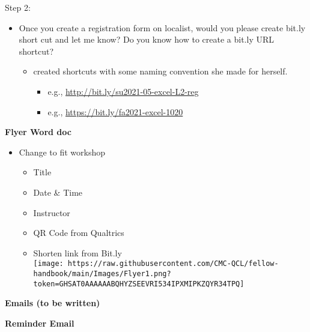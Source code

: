 \documentclass[
]{book}
\providecommand{\tightlist}{%
  \setlength{\itemsep}{0pt}\setlength{\parskip}{0pt}}
\begin{document}
Step 2:

\begin{itemize}
\tightlist
\item
  Once you create a registration form on localist, would you please create bit.ly short cut and let me know? Do you know how to create a bit.ly URL shortcut?

  \begin{itemize}
  \tightlist
  \item
    created shortcuts with some naming convention she made for herself.

    \begin{itemize}
    \tightlist
    \item
      e.g., \url{http://bit.ly/su2021-05-excel-L2-reg}
    \item
      e.g., \url{https://bit.ly/fa2021-excel-1020}
    \end{itemize}
  \end{itemize}
\end{itemize}

\textbf{Flyer Word doc}

\begin{itemize}
\tightlist
\item
  Change to fit workshop

  \begin{itemize}
  \tightlist
  \item
    Title
  \item
    Date \& Time
  \item
    Instructor
  \item
    QR Code from Qualtrics
  \item
    Shorten link from Bit.ly\\
    \texttt{[image: https://raw.githubusercontent.com/CMC-QCL/fellow-handbook/main/Images/Flyer1.png?token=GHSAT0AAAAAABQHYZSEEVRI534IPXMIPKZQYR34TPQ]}
  \end{itemize}
\end{itemize}

\textbf{Emails (to be written)}

\textbf{Reminder Email}
\end{document}
